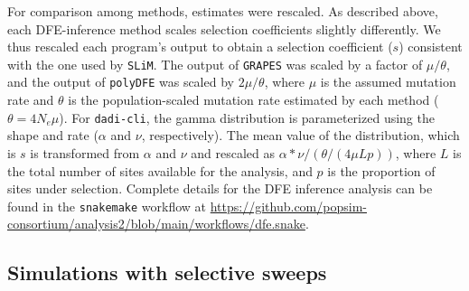 \documentclass[hidelinks]{article}
\newcommand{\slim}{\texttt{SLiM}\xspace}
\newcommand{\snakemake}{\texttt{snakemake}\xspace}
\newcommand{\polydfe}{\texttt{polyDFE}\xspace}
\newcommand{\dadicli}{\texttt{dadi-cli}\xspace}
\newcommand{\grapes}{\texttt{GRAPES}\xspace}
\begin{document}
    For comparison among methods, estimates were rescaled. 
    As described above, each DFE-inference method scales selection coefficients slightly differently.
    We thus rescaled each program's output to obtain a selection coefficient ($s$) consistent with the one used by \slim.
    The output of \grapes  was scaled by a factor of  $\mu / \theta$,
    and the output of \polydfe was scaled by $2 \mu / \theta$, 
    where $\mu$ is the assumed mutation rate and 
    $\theta$ is the population-scaled mutation rate estimated by each method ($\theta = 4N_{e}\mu$).
    For \dadicli, the gamma distribution is parameterized using the shape and rate ($\alpha$ and $\nu$, respectively). 
    The mean value of the distribution, which is $s$ is transformed from $\alpha$ and $\nu$ and rescaled as $\alpha * \nu / (\theta / (4 \mu L p))$,
    where $L$ is the total number of sites available for the analysis,
    and $p$ is the proportion of sites under selection.
    Complete details for the DFE inference analysis can be found in the
    \snakemake workflow at \url{https://github.com/popsim-consortium/analysis2/blob/main/workflows/dfe.snake}.



    \subsection*{Simulations with selective sweeps}
\end{document}
